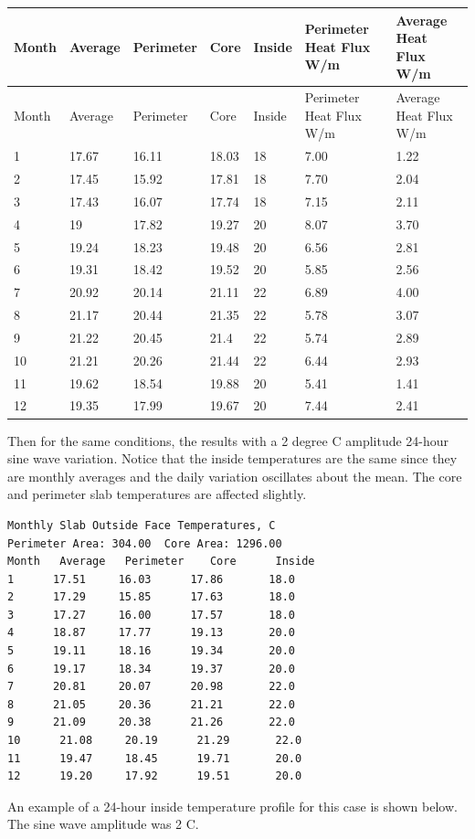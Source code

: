 \begin{longtable}[c]{p{0.85in}p{0.85in}p{0.85in}p{0.85in}p{0.85in}p{0.85in}p{0.85in}}
\toprule 
Month & Average & Perimeter & Core & Inside & Perimeter Heat Flux W/m & Average Heat Flux W/m \tabularnewline
\midrule
\endfirsthead

\toprule 
Month & Average & Perimeter & Core & Inside & Perimeter Heat Flux W/m & Average Heat Flux W/m \tabularnewline
\midrule
\endhead

1 & 17.67 & 16.11 & 18.03 & 18 & 7.00 & 1.22 \tabularnewline
2 & 17.45 & 15.92 & 17.81 & 18 & 7.70 & 2.04 \tabularnewline
3 & 17.43 & 16.07 & 17.74 & 18 & 7.15 & 2.11 \tabularnewline
4 & 19 & 17.82 & 19.27 & 20 & 8.07 & 3.70 \tabularnewline
5 & 19.24 & 18.23 & 19.48 & 20 & 6.56 & 2.81 \tabularnewline
6 & 19.31 & 18.42 & 19.52 & 20 & 5.85 & 2.56 \tabularnewline
7 & 20.92 & 20.14 & 21.11 & 22 & 6.89 & 4.00 \tabularnewline
8 & 21.17 & 20.44 & 21.35 & 22 & 5.78 & 3.07 \tabularnewline
9 & 21.22 & 20.45 & 21.4 & 22 & 5.74 & 2.89 \tabularnewline
10 & 21.21 & 20.26 & 21.44 & 22 & 6.44 & 2.93 \tabularnewline
11 & 19.62 & 18.54 & 19.88 & 20 & 5.41 & 1.41 \tabularnewline
12 & 19.35 & 17.99 & 19.67 & 20 & 7.44 & 2.41 \tabularnewline
\bottomrule
\end{longtable}

Then for the same conditions, the results with a 2 degree C amplitude 24-hour sine wave variation. Notice that the inside temperatures are the same since they are monthly averages and the daily variation oscillates about the mean. The core and perimeter slab temperatures are affected slightly.

\begin{lstlisting}
Monthly Slab Outside Face Temperatures, C
Perimeter Area: 304.00  Core Area: 1296.00
Month   Average   Perimeter    Core      Inside
1      17.51     16.03      17.86       18.0
2      17.29     15.85      17.63       18.0
3      17.27     16.00      17.57       18.0
4      18.87     17.77      19.13       20.0
5      19.11     18.16      19.34       20.0
6      19.17     18.34      19.37       20.0
7      20.81     20.07      20.98       22.0
8      21.05     20.36      21.21       22.0
9      21.09     20.38      21.26       22.0
10      21.08     20.19      21.29       22.0
11      19.47     18.45      19.71       20.0
12      19.20     17.92      19.51       20.0
\end{lstlisting}

An example of a 24-hour inside temperature profile for this case is shown below. The sine wave amplitude was 2 C.

